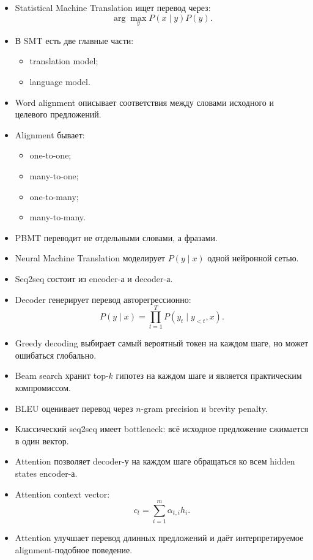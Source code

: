 \documentclass[a4paper,12pt]{article}
\begin{document}
\begin{itemize}
    \item Statistical Machine Translation ищет перевод через:
    \[
    \arg\max_y P(x \mid y)P(y).
    \]

    \item В SMT есть две главные части:
    \begin{itemize}
        \item translation model;
        \item language model.
    \end{itemize}

    \item Word alignment описывает соответствия между словами исходного и целевого предложений.

    \item Alignment бывает:
    \begin{itemize}
        \item one-to-one;
        \item many-to-one;
        \item one-to-many;
        \item many-to-many.
    \end{itemize}

    \item PBMT переводит не отдельными словами, а фразами.

    \item Neural Machine Translation моделирует \(P(y \mid x)\) одной нейронной сетью.

    \item Seq2seq состоит из encoder-а и decoder-а.

    \item Decoder генерирует перевод авторегрессионно:
    \[
    P(y \mid x)
    =
    \prod_{t=1}^{T}
    P(y_t \mid y_{<t}, x).
    \]

    \item Greedy decoding выбирает самый вероятный токен на каждом шаге, но может ошибаться глобально.

    \item Beam search хранит top-\(k\) гипотез на каждом шаге и является практическим компромиссом.

    \item BLEU оценивает перевод через \(n\)-gram precision и brevity penalty.

    \item Классический seq2seq имеет bottleneck: всё исходное предложение сжимается в один вектор.

    \item Attention позволяет decoder-у на каждом шаге обращаться ко всем hidden states encoder-а.

    \item Attention context vector:
    \[
    c_t
    =
    \sum_{i=1}^{m}
    \alpha_{t,i}h_i.
    \]

    \item Attention улучшает перевод длинных предложений и даёт интерпретируемое alignment-подобное поведение.
\end{itemize}
\end{document}
